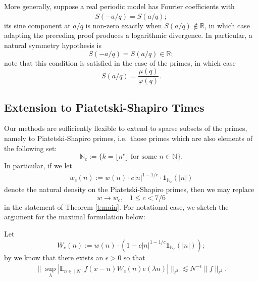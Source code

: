 \documentclass[12pt]{amsart}
\numberwithin{equation}{section}
\theoremstyle{definition}
\begin{document}
More generally, suppose a real periodic model has Fourier coefficients with
\[ S(-a/q) = \overline{S(a/q)};\]
its sine component at $a/q$ is non-zero exactly when $S(a/q) \notin \mathbb{R}$, in which case adapting the preceding proof produces a logarithmic divergence. In particular, a natural symmetry hypothesis is
\[ S(-a/q) = S(a/q) \in \mathbb{R};\]
note that this condition is satisfied in the case of the primes, in which case
\[ S(a/q) = \frac{\mu(q)}{\varphi(q)}.\]

\subsection{Extension to Piatetski-Shapiro Times}
Our methods are sufficiently flexible to extend to sparse subsets of the primes, namely to Piatetski-Shapiro primes, i.e.\ those primes which are also elements of the following set:
\[\mathbb{N}_c := \{ k = \lfloor n^c \rfloor \text{ for some } n \in \mathbb{N} \}.\]
In particular, if we let
\begin{align}
    w_c(n) := w(n) \cdot c |n|^{1-1/c} \cdot \mathbf{1}_{\mathbb{N}_c}(|n|)
\end{align}
denote the natural density on the Piatetski-Shapiro primes, then we may replace
\[ w\longrightarrow w_c, \; \; \; 1 \leq c < 7/6\]
in the statement of Theorem \ref{t:main}. For notational ease, we sketch the argument for the maximal formulation below:

Let 
\[ W_c(n) := w(n) \cdot ( 1 - c |n|^{1-1/c} \mathbf{1}_{\mathbb{N}_c}(|n|));\]
by \cite{FKT1} we know that there exists an $\epsilon > 0$ so that
\begin{align}
\| \sup_\lambda | \mathbb{E}_{n \in [N]} f(x-n) W_c(n) e(\lambda n) | \|_{\ell^2} \lesssim N^{-\epsilon} \|  f \|_{\ell^2}.    
\end{align}
\end{document}
